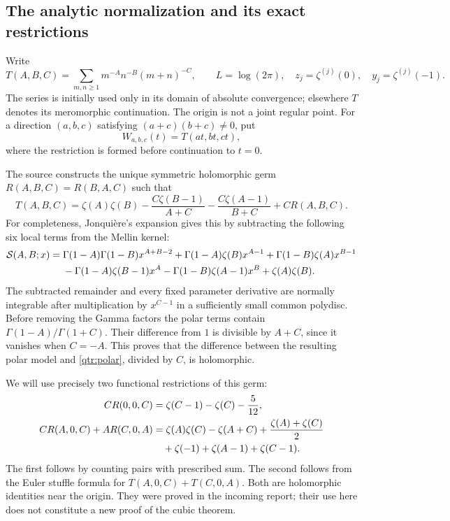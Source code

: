 \documentclass[11pt,a4paper]{article}
\numberwithin{equation}{section}
\theoremstyle{definition}
\theoremstyle{remark}
\begin{document}
\subsection{The analytic normalization and its exact restrictions}

Write
\[
 T(A,B,C)=\sum_{m,n\ge1}m^{-A}n^{-B}(m+n)^{-C},\qquad
 L=\log(2\pi),\quad z_j=\zeta^{(j)}(0),\quad
 y_j=\zeta^{(j)}(-1).
\]
The series is initially used only in its domain of absolute
convergence; elsewhere \(T\) denotes its meromorphic continuation.
The origin is not a joint regular point. For a direction
\((a,b,c)\) satisfying \((a+c)(b+c)\ne0\), put
\[
 W_{a,b,c}(t)=T(at,bt,ct),
\]
where the restriction is formed before continuation to \(t=0\).

The source constructs the unique symmetric holomorphic germ
\(R(A,B,C)=R(B,A,C)\) such that
\begin{equation}\label{qtr:polar}
 T(A,B,C)=\zeta(A)\zeta(B)
 -\frac{C\zeta(B-1)}{A+C}
 -\frac{C\zeta(A-1)}{B+C}+C R(A,B,C).
\end{equation}
For completeness, Jonqui\`ere's expansion \cite[25.12.12]{DLMF}
gives this by subtracting the following six local terms from the
Mellin kernel:
\begin{align}
 \mathcal S(A,B;x)={}&
 \Gamma(1-A)\Gamma(1-B)x^{A+B-2}
 +\Gamma(1-A)\zeta(B)x^{A-1}
 +\Gamma(1-B)\zeta(A)x^{B-1}\notag\\
 &-\Gamma(1-A)\zeta(B-1)x^A
 -\Gamma(1-B)\zeta(A-1)x^B+\zeta(A)\zeta(B).
 \label{qtr:S}
\end{align}
The subtracted remainder and every fixed parameter derivative are
normally integrable after multiplication by \(x^{C-1}\) in a
sufficiently small common polydisc. Before removing the Gamma
factors the polar terms contain
\(\Gamma(1-A)/\Gamma(1+C)\). Their difference from \(1\) is
divisible by \(A+C\), since it vanishes when \(C=-A\).
This proves that the difference between the resulting polar model
and \eqref{qtr:polar}, divided by \(C\), is holomorphic.

We will use precisely two functional restrictions of this germ:
\begin{align}
 C R(0,0,C)&=\zeta(C-1)-\zeta(C)-\frac5{12},
 \label{qtr:axis}\\
 C R(A,0,C)+A R(C,0,A)
 &=\zeta(A)\zeta(C)-\zeta(A+C)
 +\frac{\zeta(A)+\zeta(C)}2\notag\\
 &\quad+\zeta(-1)+\zeta(A-1)+\zeta(C-1).
 \label{qtr:Euler}
\end{align}
The first follows by counting pairs with prescribed sum.
The second follows from the Euler stuffle formula for
\(T(A,0,C)+T(C,0,A)\). Both are holomorphic identities near the
origin. They were proved in the incoming report; their use here
does not constitute a new proof of the cubic theorem.
\end{document}
